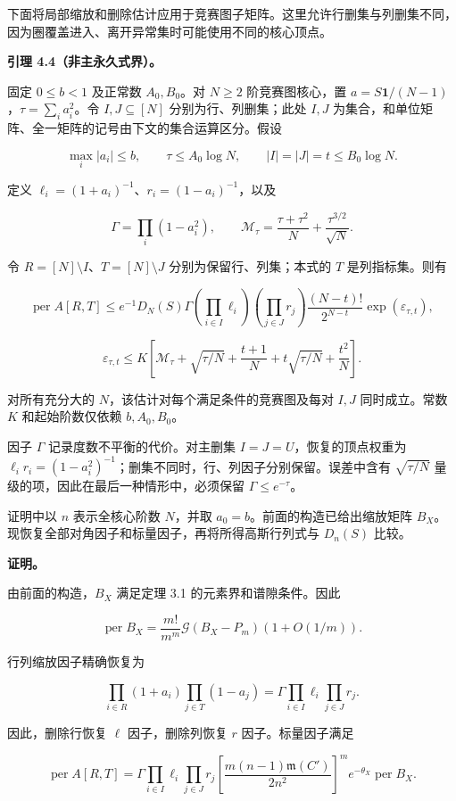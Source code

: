 \documentclass[11pt,a4paper]{article}
\begin{document}
下面将局部缩放和删除估计应用于竞赛图子矩阵。这里允许行删集与列删集不同，因为圈覆盖进入、离开异常集时可能使用不同的核心顶点。

\textbf{引理 4.4（非主永久式界）。}

固定 \(0\le b<1\) 及正常数 \(A_0,B_0\)。对 \(N\ge2\) 阶竞赛图核心，置 \(a=S\mathbf1/(N-1)\)，\(\tau=\sum_i a_i^2\)。令 \(I,J\subseteq[N]\) 分别为行、列删集；此处 \(I,J\) 为集合，和单位矩阵、全一矩阵的记号由下文的集合运算区分。假设

\[
\max_i|a_i|\le b,\qquad
\tau\le A_0\log N,\qquad
|I|=|J|=t\le B_0\log N.
\]

定义 \(\ell_i=(1+a_i)^{-1}\)、\(r_i=(1-a_i)^{-1}\)，以及

\[
\Gamma=\prod_i(1-a_i^2),\qquad
\mathcal M_\tau=\frac{\tau+\tau^2}{N}+\frac{\tau^{3/2}}{\sqrt N}.
\]

令 \(R=[N]\setminus I\)、\(T=[N]\setminus J\) 分别为保留行、列集；本式的 \(T\) 是列指标集。则有

\[
\operatorname{per}A[R,T]\le
e^{-1}D_N(S)\Gamma
\left(\prod_{i\in I}\ell_i\right)
\left(\prod_{j\in J}r_j\right)
\frac{(N-t)!}{2^{N-t}}\exp(\varepsilon_{\tau,t}),
\]

\[
\varepsilon_{\tau,t}\le K\left[
\mathcal M_\tau+\sqrt{\tau/N}+\frac{t+1}{N}
+t\sqrt{\tau/N}+\frac{t^2}{N}\right].
\]

对所有充分大的 \(N\)，该估计对每个满足条件的竞赛图及每对 \(I,J\) 同时成立。常数 \(K\) 和起始阶数仅依赖 \(b,A_0,B_0\)。

因子 \(\Gamma\) 记录度数不平衡的代价。对主删集 \(I=J=U\)，恢复的顶点权重为 \(\ell_i r_i=(1-a_i^2)^{-1}\)；删集不同时，行、列因子分别保留。误差中含有 \(\sqrt{\tau/N}\) 量级的项，因此在最后一种情形中，必须保留 \(\Gamma\le e^{-\tau}\)。

证明中以 \(n\) 表示全核心阶数 \(N\)，并取 \(a_0=b\)。前面的构造已给出缩放矩阵 \(B_X\)。现恢复全部对角因子和标量因子，再将所得高斯行列式与 \(D_n(S)\) 比较。

\textbf{证明。}

由前面的构造，\(B_X\) 满足定理 3.1 的元素界和谱隙条件。因此

\[
\operatorname{per}B_X=\frac{m!}{m^m}\mathcal G(B_X-P_m)(1+O(1/m)).
\]

行列缩放因子精确恢复为

\[
\prod_{i\in R}(1+a_i)\prod_{j\in T}(1-a_j)=\Gamma\prod_{i\in I}\ell_i\prod_{j\in J}r_j.
\]

因此，删除行恢复 \(\ell\) 因子，删除列恢复 \(r\) 因子。标量因子满足

\begin{equation}
\operatorname{per}A[R,T]=\Gamma\prod_{i\in I}\ell_i\prod_{j\in J}r_j\left[\frac{m(n-1)\mathfrak m(C')}{2n^2}\right]^m e^{-\theta_X}\operatorname{per}B_X.
\tag{4.2}
\label{eq-exact-restoration}
\end{equation}
\end{document}
